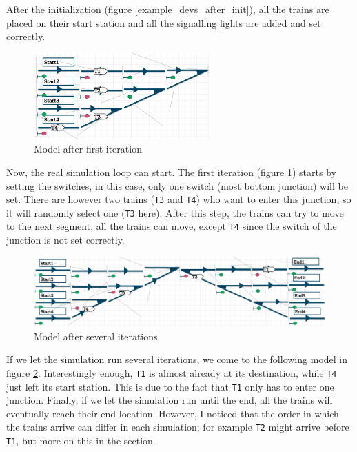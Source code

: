 \documentclass{article}
\begin{document}
After the initialization (figure \ref{example_devs_after_init}), all the trains are placed on their start station and all the signalling lights are added and set correctly.


\begin{figure}[H]
    \centering
    \includegraphics[width=0.6\textwidth]{images/example_devs_after_first_iter.png}
    \caption{Model after first iteration}
    \label{example_devs_after_first_iter}
\end{figure}

Now, the real simulation loop can start. The first iteration (figure \ref{example_devs_after_first_iter}) starts by setting the switches, in this case, only one switch (most bottom junction) will be set. There are however two trains (\texttt{T3} and \texttt{T4}) who want to enter this junction, so it will randomly select one (\texttt{T3} here). After this step, the trains can try to move to the next segment, all the trains can move, except \texttt{T4} since the switch of the junction is not set correctly.

\begin{figure}[H]
    \centering
    \includegraphics[width=\textwidth]{images/example_devs_after_few_iters.png}
    \caption{Model after several iterations}
    \label{example_devs_after_few_iters}
\end{figure}

If we let the simulation run several iterations, we come to the following model in figure \ref{example_devs_after_few_iters}. Interestingly enough, \texttt{T1} is almost already at its destination, while \texttt{T4} just left its start station. This is due to the fact that \texttt{T1} only has to enter one junction. Finally, if we let the simulation run until the end, all the trains will eventually reach their end location. However, I noticed that the order in which the trains arrive can differ in each simulation; for example \texttt{T2} might arrive before \texttt{T1}, but more on this in the  section.
\end{document}

